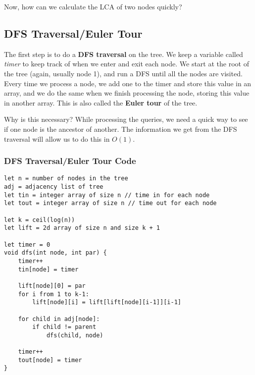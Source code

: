 \documentclass{article}
\begin{document}
\begin{center}
 \end{center}
 
 Now, how can we calculate the LCA of two nodes quickly?

\subsection{DFS Traversal/Euler Tour}
The first step is to do a \textbf{DFS traversal} on the tree. We keep a variable called \textit{timer} to keep track of when we enter and exit each node. We start at the root of the tree (again, usually node 1), and run a DFS until all the nodes are visited. Every time we process a node, we add one to the timer and store this value in an array, and we do the same when we finish processing the node, storing this value in another array. This is also called the \textbf{Euler tour} of the tree.

Why is this necessary? While processing the queries, we need a quick way to see if one node is the ancestor of another. The information we get from the DFS traversal will allow us to do this in $O(1)$.

\subsubsection{DFS Traversal/Euler Tour Code}
\begin{lstlisting}
let n = number of nodes in the tree
adj = adjacency list of tree
let tin = integer array of size n // time in for each node
let tout = integer array of size n // time out for each node

let k = ceil(log(n))
let lift = 2d array of size n and size k + 1

let timer = 0
void dfs(int node, int par) {
	timer++
	tin[node] = timer
	
	lift[node][0] = par
	for i from 1 to k-1:
		lift[node][i] = lift[lift[node][i-1]][i-1]
	
	for child in adj[node]:
		if child != parent
			dfs(child, node)
	
	timer++
	tout[node] = timer
}
\end{lstlisting}
\end{document}
